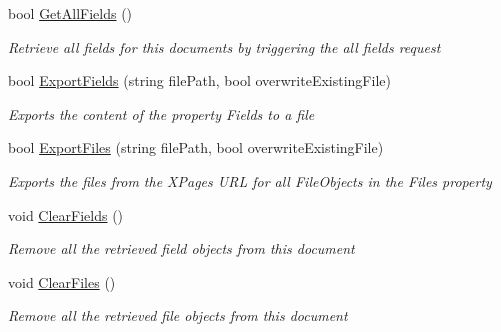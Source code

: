 \begin{DoxyCompactItemize}
bool \mbox{\hyperlink{class_document_object_a5e070c7c0a45ac06422ee992c841e780}{Get\+All\+Fields}} ()
\begin{DoxyCompactList}\small\item\em Retrieve all fields for this documents by triggering the all fields request \end{DoxyCompactList}\item 
bool \mbox{\hyperlink{class_document_object_a1a763aa01710b370634f46c89b7d2d8e}{Export\+Fields}} (string file\+Path, bool overwrite\+Existing\+File)
\begin{DoxyCompactList}\small\item\em Exports the content of the property \textquotesingle{}Fields\textquotesingle{} to a file \end{DoxyCompactList}\item 
bool \mbox{\hyperlink{class_document_object_a8753abc5a871bf84fc910e6a99936b2b}{Export\+Files}} (string file\+Path, bool overwrite\+Existing\+File)
\begin{DoxyCompactList}\small\item\em Exports the files from the X\+Pages U\+RL for all File\+Objects in the Files property \end{DoxyCompactList}\item 
void \mbox{\hyperlink{class_document_object_a28ab6562c34b5cf44ce7ab738d1730e1}{Clear\+Fields}} ()
\begin{DoxyCompactList}\small\item\em Remove all the retrieved field objects from this document \end{DoxyCompactList}\item 
void \mbox{\hyperlink{class_document_object_a4caebae7aec2a9375112739d2cf29f29}{Clear\+Files}} ()
\begin{DoxyCompactList}\small\item\em Remove all the retrieved file objects from this document \end{DoxyCompactList}\end{DoxyCompactItemize}
